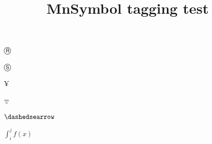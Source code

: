 \documentclass{article}
\title{MnSymbol tagging test}
\def\circledR{Ⓡ}
\def\circledS{Ⓢ}
\def\yen{¥}
\begin{document}
\circledR

\circledS

\yen

\dagger

\ddagger

\mathparagraph

\mathsection

\mathdollar

\mathsterling

$\doublebarwedge$

$\dashedsearrow$

$\int_i^j f(x)$
\end{document}

